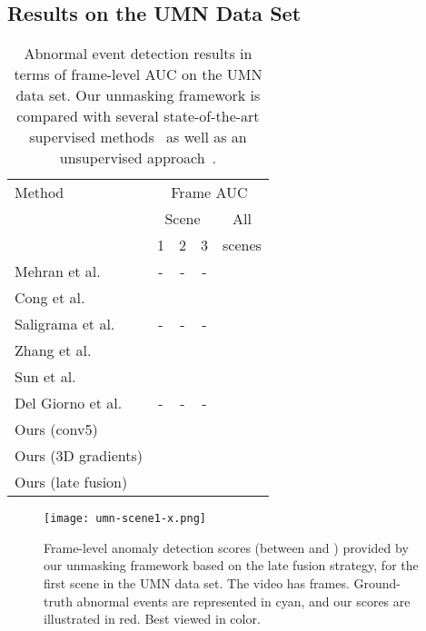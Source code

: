 \documentclass[10pt,twocolumn,letterpaper]{article}
\begin{document}
\vspace*{-0.1cm}
\subsection{Results on the UMN Data Set}

\begin{table}[t]
\small{
\begin{center}
\begin{tabular}{|l|c|c|c|c|}
\hline
Method 																& \multicolumn{4}{|c|}{Frame AUC} \\
\cline{2-5}
			 																& \multicolumn{3}{|c|}{Scene} 									& All \\
\cline{2-4}
			 																&  1   					&  2 						&  3 						& scenes \\
\hline
\hline
Mehran et al.~\cite{Mehran-CVPR-2009}				& -						& - 						& -						& \\
Cong et al.~\cite{Cong-CVPR-2011}					& 			&  		& 			& \\
Saligrama et al.~\cite{Saligrama-CVPR-2012}		& -						& -	 					& -						& \\
Zhang et al.~\cite{Zhang-PR-2016}						& 			&  		& 			& \\
Sun et al.~\cite{Sun-PR-2017}							& 			&  		& 			& \\
Del Giorno et al.~\cite{Giorno-ECCV-2016}			& -						& -						& - 						& \\
\hline
Ours (conv5)														& 			&  		& 			& \\
Ours (3D gradients)												& 			&  		& 			& \\
Ours (late fusion)													& 			&  		& 			& \\
\hline
\end{tabular}
\end{center}
}
\vspace*{-0.1cm}
\caption{Abnormal event detection results in terms of frame-level AUC on the UMN data set. Our unmasking framework is compared with several state-of-the-art supervised methods~\cite{Cong-CVPR-2011,Mehran-CVPR-2009,Saligrama-CVPR-2012,Sun-PR-2017,Zhang-PR-2016} as well as an unsupervised approach~\cite{Giorno-ECCV-2016}.}
\label{tab_UMN}
\vspace*{-0.2cm}
\end{table}

\begin{figure}
\begin{center}
\texttt{[image: umn-scene1-x.png]}
\end{center}
\vspace*{-0.3cm}
\caption{Frame-level anomaly detection scores (between  and ) provided by our unmasking framework based on the late fusion strategy, for the first scene in the UMN data set. The video has  frames. Ground-truth abnormal events are represented in cyan, and our scores are illustrated in red. Best viewed in color.}
\label{fig_UMN_scene1}
\vspace*{-0.1cm}
\end{figure}
\end{document}
